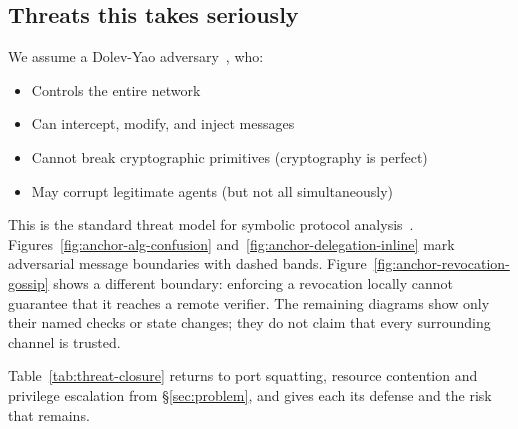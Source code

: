 \documentclass[11pt,a4paper]{article}
\theoremstyle{definition}
\begin{document}
\subsection{Threats this takes seriously}\label{sec:threat-model}

We assume a Dolev-Yao adversary~, who:
\begin{itemize}
  \item Controls the entire network
  \item Can intercept, modify, and inject messages
  \item Cannot break cryptographic primitives (cryptography is perfect)
  \item May corrupt legitimate agents (but not all simultaneously)
\end{itemize}

This is the standard threat model for symbolic protocol analysis~. Figures~\ref{fig:anchor-alg-confusion} and~\ref{fig:anchor-delegation-inline} mark adversarial message boundaries with dashed bands. Figure~\ref{fig:anchor-revocation-gossip} shows a different boundary: enforcing a revocation locally cannot guarantee that it reaches a remote verifier. The remaining diagrams show only their named checks or state changes; they do not claim that every surrounding channel is trusted.

Table~\ref{tab:threat-closure} returns to port squatting, resource contention and privilege escalation from \S\ref{sec:problem}, and gives each its defense and the risk that remains.
\end{document}
